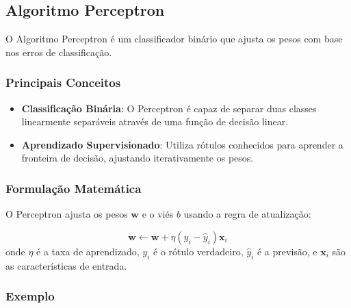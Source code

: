 \documentclass[
  a4paperpaper,
]{article}
\providecommand{\tightlist}{%
  \setlength{\itemsep}{0pt}\setlength{\parskip}{0pt}}\usepackage{longtable,booktabs,array}
\begin{document}
\subsection{Algoritmo Perceptron}\label{algoritmo-perceptron}

O Algoritmo Perceptron é um classificador binário que ajusta os pesos
com base nos erros de classificação.

\subsubsection{Principais Conceitos}\label{principais-conceitos}

\begin{itemize}
\tightlist
\item
  \textbf{Classificação Binária}: O Perceptron é capaz de separar duas
  classes linearmente separáveis através de uma função de decisão
  linear.
\item
  \textbf{Aprendizado Supervisionado}: Utiliza rótulos conhecidos para
  aprender a fronteira de decisão, ajustando iterativamente os pesos.
\end{itemize}

\subsubsection{Formulação
Matemática}\label{formulauxe7uxe3o-matemuxe1tica}

O Perceptron ajusta os pesos \(\boldsymbol{w}\) e o viés \(b\) usando a
regra de atualização:

\[
\boldsymbol{w} \leftarrow \boldsymbol{w} + \eta (y_i - \hat{y}_i) \boldsymbol{x}_i
\] onde \(\eta\) é a taxa de aprendizado, \(y_i\) é o rótulo verdadeiro,
\(\hat{y}_i\) é a previsão, e \(\boldsymbol{x}_i\) são as
características de entrada.

\subsubsection{Exemplo}\label{exemplo}
\end{document}
